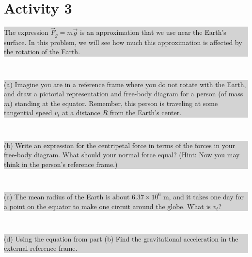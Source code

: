\documentclass[]{article}
\newcommand{\excerpt}[1]{\colorbox{lightgray}{\parbox{14.8cm}{#1}} \\}
\begin{document}
\section*{Activity 3}
\excerpt{
The expression $ \vec{F}_{g} = m\vec{g} $ is an approximation that we use near the Earth's surface. In this problem, we will see how much this approximation is affected by the rotation of the Earth.
}
\excerpt{
(a) Imagine you are in a reference frame where you do not rotate with the Earth, and draw a pictorial representation and free-body diagram for a person (of mass $ m $) standing at the equator. Remember, this person is traveling at some tangential speed $ v_{t} $ at a distance $ R $ from the Earth's center.
}
\excerpt{
(b) Write an expression for the centripetal force in terms of the forces in your free-body diagram. What should your normal force equal? (Hint: Now you may think in the person's reference frame.)
}
\excerpt{
(c) The mean radius of the Earth is about $ 6.37\times 10^{6} $ m, and it takes one day for a point on the equator to make one circuit around the globe. What is $ v_{t} $?
}
\excerpt{
(d) Using the equation from part (b) Find the gravitational acceleration in the external reference frame.
}
\end{document}
